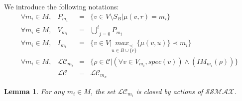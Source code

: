 \documentclass[11pt]{article}
\newtheorem{lem}{Lemma}
\newenvironment{lemma}[1]{\vspace{-0.25cm}\begin{lem}#1}{\end{lem}\vspace{-0.3cm}}
\begin{document}
We introduce the following notations:
\[\begin{array}{rrcl}
\forall m_i\in M, & P_{m_i} & = & \big\{v\in V\setminus S_B\big| \mu(v,r)=m_i\big\}\\
\forall m_i\in M, & V_{m_i} & = & \underset{j=0}{\overset{i}{\bigcup}}P_{m_j}\\
\forall m_i\in M, & I_{m_i} & = & \big\{v\in V\big|\underset{u\in B\cup\{r\}}{max_\prec}\{\mu(v,u)\}\prec m_i \big\}\\
\forall m_i\in M, & \mathcal{LC}_{m_i} & = & \big\{\rho\in\mathcal{C}\big|(\forall v\in V_{m_i}, spec(v))\wedge(IM_{m_i}(\rho))\big\}\\
 & \mathcal{LC} & = & \mathcal{LC}_{m_k}
\end{array}\]

\begin{lemma}\label{lem:LCmiclosed}
For any $m_i\in M$, the set $\mathcal{LC}_{m_i}$ is closed by actions of $\mathcal{SSMAX}$.
\end{lemma}
\end{document}
